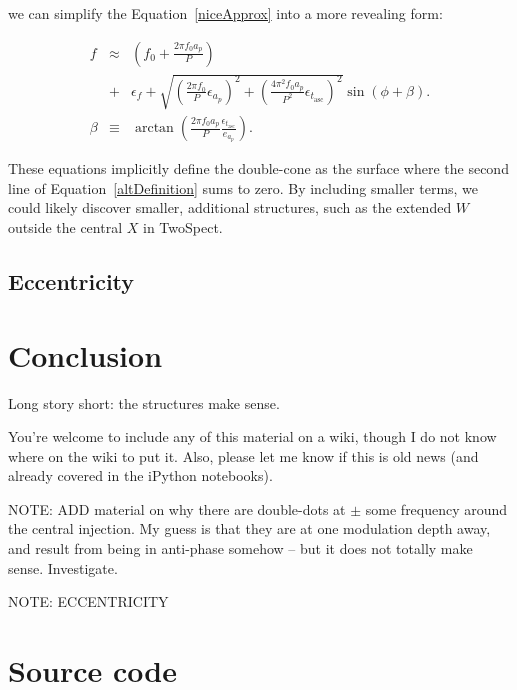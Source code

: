 \documentclass{article}
\begin{document}
\noindent we can simplify the Equation~\ref{niceApprox} into a more revealing form:

\begin{eqnarray}
f &\approx& \left(f_0 + \frac{2\pi f_0 a_p}{P} \right) \nonumber\\
  &+& \epsilon_f  + \sqrt{\left(\frac{2 \pi f_0}{P} \epsilon_{a_p}\right)^2 + \left(\frac{4 \pi^2 f_0 a_p}{P^2} \epsilon_{t_\mathrm{asc}}\right)^2 } \sin \left(\phi + \beta \right). \label{altDefinition}\\
\beta &\equiv& \arctan\left(\frac{2\pi f_0 a_p}{P} \frac{\epsilon_{t_\mathrm{asc}}}{e_{a_p}} \right).
\end{eqnarray}

\noindent These equations implicitly define the double-cone as the surface where the second line of Equation~\ref{altDefinition} sums to zero.
By including smaller terms, we could likely discover smaller, additional structures, such as the extended $W$ outside the central $X$ in TwoSpect.

\subsection{Eccentricity}

\section{Conclusion}


Long story short: the structures make sense.

You're welcome to include any of this material on a wiki, though I do
not know where on the wiki to put it. Also, please let me know if this
is old news (and already covered in the iPython notebooks).


NOTE: ADD material on why there are double-dots at $\pm$ some frequency around the central injection. My guess is that they are at one modulation depth away, and result from being in anti-phase somehow -- but it does not totally make sense. Investigate.

NOTE: ECCENTRICITY

\newpage

\appendix
\section{Source code}
\label{source_code_appendix}
\end{document}
